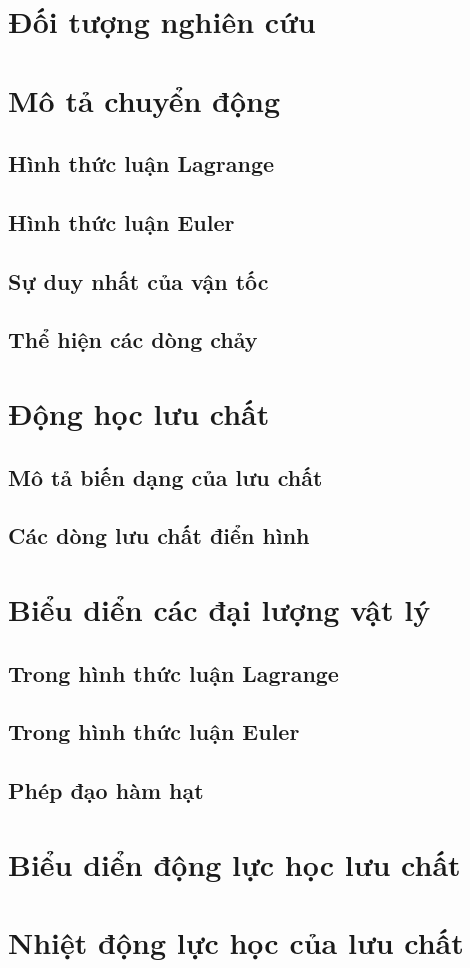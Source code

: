 \documentclass[../../main.tex]{subfiles}
\begin{document}
\section{Đối tượng nghiên cứu}
	
\section{Mô tả chuyển động}
	\subsection{Hình thức luận Lagrange}
		
	\subsection{Hình thức luận Euler}
		
	\subsection{Sự duy nhất của vận tốc}
		
	\subsection{Thể hiện các dòng chảy}
		
\section{Động học lưu chất}
	\subsection{Mô tả biến dạng của lưu chất}
		
	\subsection{Các dòng lưu chất điển hình}
		
\section{Biểu diển các đại lượng vật lý}
	\subsection{Trong hình thức luận Lagrange}
		
	\subsection{Trong hình thức luận Euler}
		
	\subsection{Phép đạo hàm hạt}
		
\section{Biểu diển động lực học lưu chất}
	
\section{Nhiệt động lực học của lưu chất}
	
\end{document}
